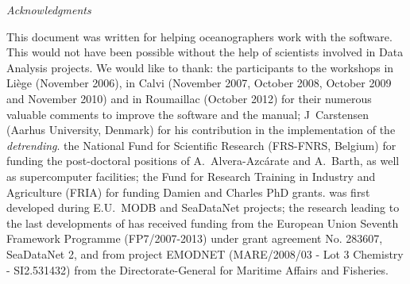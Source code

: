 
\vspace*{\fill}




{\it
\Large{Acknowledgments}
\vspace{1cm}
\parindent 1cm
\begin{center}
\begin{minipage}[c]{.85\textwidth}
\normalsize
This document was written for helping oceanographers work with the \diva software. This would not have been possible without the help of scientists involved in Data Analysis projects.
\newline
\newline
We would like to thank:
\newline
\newline
the participants to the \diva workshops in Li\`{e}ge (November 2006), in Calvi (November 2007, October 2008, October 2009 and November 2010) and in Roumaillac (October 2012) for their numerous valuable comments to improve the software and the manual;
\newline
\newline
J~Carstensen (Aarhus University, Denmark) for his contribution in the implementation of the \textit{detrending}.
\newline
\newline 
the National Fund for Scientific Research (FRS-FNRS, Belgium) for funding the post-doctoral positions of A.~Alvera-Azc\'{a}rate and A.~Barth, as well as supercomputer facilities;
\newline
\newline
the Fund for Research Training in Industry and Agriculture (FRIA) for funding Damien and Charles PhD grants.
\newline
\newline
\diva was first developed during E.U.~MODB and SeaDataNet projects; the research leading to the last developments of \diva has received funding from the European Union Seventh Framework Programme (FP7/2007-2013) under grant agreement No. 283607, SeaDataNet 2, and from project EMODNET (MARE/2008/03 - Lot 3 Chemistry - SI2.531432) from the Directorate-General for Maritime Affairs and Fisheries. 
\vspace{2cm}
\end{minipage}

\end{center}
}

\vspace*{\fill}

\newpage
